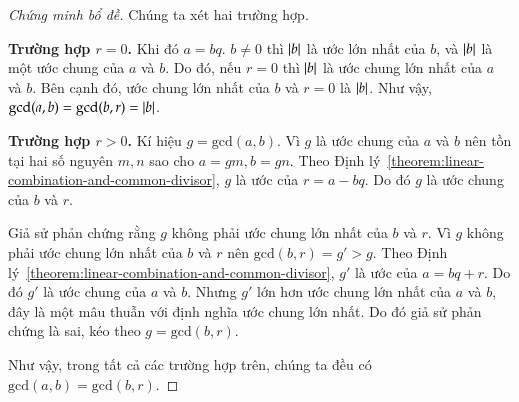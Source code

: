 \begin{proof}[Chứng minh bổ đề]
	Chúng ta xét hai trường hợp.

	\textbf{Trường hợp $r = 0$.} Khi đó $a = b q$. $b\ne 0$ thì $\left\vert{b}\right\vert$ là ước lớn nhất của $b$, và $\left\vert{b}\right\vert$ là một ước chung của $a$ và $b$. Do đó, nếu $r = 0$ thì $\left\vert{b}\right\vert$ là ước chung lớn nhất của $a$ và $b$. Bên cạnh đó, ước chung lớn nhất của $b$ và $r = 0$ là $\left\vert{b}\right\vert$. Như vậy, $\text{gcd}(a, b) = \text{gcd}(b, r) = \left\vert{b}\right\vert$.

	\textbf{Trường hợp $r > 0$.} Kí hiệu $g = \text{gcd}(a, b)$. Vì $g$ là ước chung của $a$ và $b$ nên tồn tại hai số nguyên $m, n$ sao cho $a = g m, b = g n$. Theo Định lý~\ref{theorem:linear-combination-and-common-divisor}, $g$ là ước của $r = a - b q$. Do đó $g$ là ước chung của $b$ và $r$.

	Giả sử phản chứng rằng $g$ không phải ước chung lớn nhất của $b$ và $r$. Vì $g$ không phải ước chung lớn nhất của $b$ và $r$ nên $\text{gcd}(b, r) = g' > g$. Theo Định lý~\ref{theorem:linear-combination-and-common-divisor}, $g'$ là ước của $a = b q + r$.  Do đó $g'$ là ước chung của $a$ và $b$. Nhưng $g'$ lớn hơn ước chung lớn nhất của $a$ và $b$, đây là một mâu thuẫn với định nghĩa ước chung lớn nhất. Do đó giả sử phản chứng là sai, kéo theo $g = \text{gcd}(b, r)$.

	Như vậy, trong tất cả các trường hợp trên, chúng ta đều có $\text{gcd}(a, b) = \text{gcd}(b, r)$.
\end{proof}

